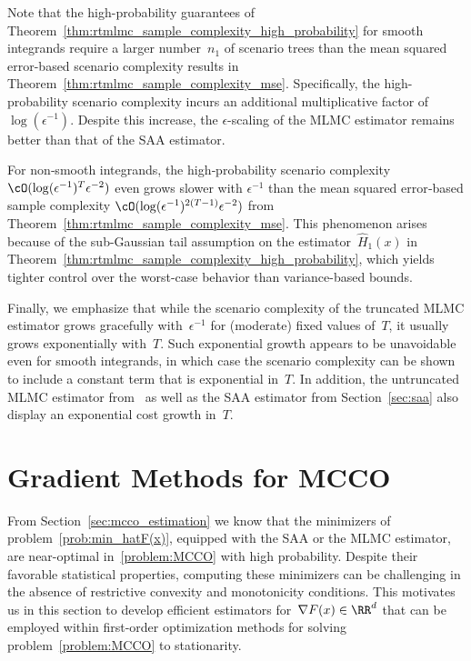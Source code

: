 \documentclass[11pt]{article}
\let\hat\widehat
\begin{document}
Note that the high-probability guarantees of Theorem~\ref{thm:rtmlmc_sample_complexity_high_probability} for smooth integrands require a larger number~$n_1$ of scenario trees than the mean squared error-based scenario complexity results in Theorem~\ref{thm:rtmlmc_sample_complexity_mse}. Specifically, the high-probability scenario complexity incurs an additional multiplicative factor of~$\log(\epsilon^{-1})$. Despite this increase, the $\epsilon$-scaling of the MLMC estimator remains better than that of the SAA estimator. 


For non‐smooth integrands, the high‐probability scenario complexity $\cO(\log(\epsilon^{-1})^T \epsilon^{-2})$ even grows slower with $\epsilon^{-1}$ than the mean squared error‐based sample complexity $\cO(\log(\epsilon^{-1})^{2(T-1)} \epsilon^{-2})$ from Theorem~\ref{thm:rtmlmc_sample_complexity_mse}. This phenomenon arises because of the sub-Gaussian tail assumption on the estimator~$\hat{H}_1(x)$ in Theorem~\ref{thm:rtmlmc_sample_complexity_high_probability}, which yields tighter control over the worst-case behavior than variance-based bounds. 

Finally, we emphasize that while the scenario complexity of the truncated MLMC estimator grows gracefully with~$\epsilon^{-1}$ for (moderate) fixed values of~$T$, it usually grows exponentially with~$T$. Such exponential growth appears to be unavoidable even for smooth integrands, in which case the scenario complexity can be shown to include a constant term that is exponential in~$T$. In addition, the untruncated MLMC estimator from~\cite{syed2023optimal} as well as the SAA estimator from Section~\ref{sec:saa} also display an exponential cost growth in~$T$. 




\section{Gradient Methods for MCCO}
\label{sec:mcco_optimization}
From Section~\ref{sec:mcco_estimation} we know that the minimizers of problem~\eqref{prob:min_hatF(x)}, equipped with the SAA or the MLMC estimator, are near-optimal in~\eqref{problem:MCCO} with high probability. Despite their favorable statistical properties, computing these minimizers can be challenging in the absence of restrictive convexity and monotonicity conditions. This motivates us in this section to develop efficient estimators for~$\nabla F(x)\in\RR^d$ that can be employed within first-order optimization methods for solving problem~\eqref{problem:MCCO} to stationarity. 
\end{document}
